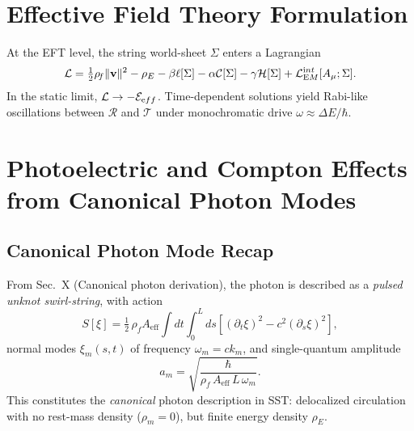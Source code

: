\documentclass[11pt,a4paper]{article}
\newcommand{\rhof}{\rho_{\!f}}                           %
\newcommand{\rhoE}{\rho_{\!E}}                           %
\newcommand{\rhom}{\rho_{\!m}}                           %
\begin{document}
\section{Effective Field Theory Formulation}

At the EFT level, the string world-sheet $\Sigma$ enters a Lagrangian
\begin{equation}
\mathcal L = \tfrac12 \rhof \|\mathbf v\|^2 - \rho_E
- \beta \ell[\Sigma] - \alpha \mathcal C[\Sigma]
- \gamma \mathcal H[\Sigma] + \mathcal L_{\textrm EM}^{\textrm int}[A_\mu;\Sigma].
\end{equation}
In the static limit, $\mathcal L \to -\mathcal E_{\textrm eff}$.
Time-dependent solutions yield Rabi-like oscillations between $\mathcal R$ and $\mathcal T$ 
under monochromatic drive $\omega\approx \Delta E/\hbar$.


\section{Photoelectric and Compton Effects from Canonical Photon Modes}

    \subsection{Canonical Photon Mode Recap}
    From Sec.~X (Canonical photon derivation), the photon is described as a
    \emph{pulsed unknot swirl-string}, with action
    \[
    S[\xi] = \tfrac{1}{2}\,\rhof A_{\mathrm{eff}}
    \int dt \int_0^L ds \left[(\partial_t \xi)^2 - c^2 (\partial_s \xi)^2 \right],
    \]
    normal modes $\xi_m(s,t)$ of frequency $\omega_m=c k_m$,
    and single-quantum amplitude
    \begin{equation}
    a_m = \sqrt{\frac{\hbar}{\rhof\,A_{\mathrm{eff}}\,L\,\omega_m}}.
    \label{eq:canonical-photon-amplitude}
    \end{equation}
    This constitutes the \emph{canonical} photon description in SST:
    delocalized circulation with no rest-mass density ($\rhom=0$),
    but finite energy density $\rhoE$.
\end{document}
